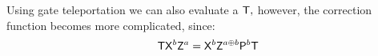 \begin{remark}
Using gate teleportation we can also evaluate a  ${\sf T},$ however, the correction function becomes more complicated, since:
						\begin{equation}{\sf T} {\sf X}^b {\sf Z}^a= {\sf X}^b {\sf Z}^{a\oplus b} {\sf P}^b {\sf T} \end{equation}
\end{remark}				




